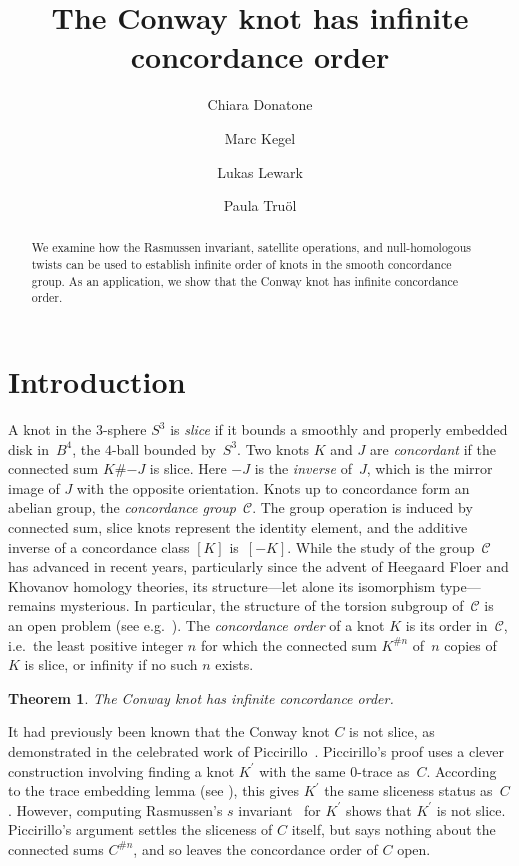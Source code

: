 \documentclass{amsart}
\title{The Conway knot has infinite concordance order}
\author{Chiara Donatone}
\author{Marc Kegel}
\author{Lukas Lewark}
\author{Paula Truöl}
\newcommand{\CC}{\mathcal{C}}
\newcommand{\pr}{^{\prime}}
\newtheorem{theorem}{Theorem}%
\theoremstyle{remark}
\begin{document}
\begin{abstract}
We examine how the Rasmussen invariant, satellite operations, and null-homologous twists can be used to establish infinite order of knots in the smooth concordance group. As an application, we show that the Conway knot has infinite concordance order.
\end{abstract}
\maketitle

\section{Introduction}

A knot in the $3$-sphere $S^3$ is \emph{slice} if it bounds a smoothly and properly embedded disk in~$B^4$, the $4$-ball bounded by~$S^3$. Two knots $K$ 
and $J$ are \emph{concordant} if the connected sum $K \# {-J}$ is slice. Here $-J$ is the \emph{inverse} of~$J$, which is the 
mirror image of $J$ with the opposite orientation.
Knots up to concordance form an abelian group, the \emph{concordance group}~$\CC$. The group operation is induced by connected sum, slice knots represent the identity element, and the additive inverse of a concordance class $[K]$ is~$[-K]$. While the study of the group~$\CC$ has advanced in recent years, particularly since the advent of Heegaard Floer and Khovanov homology theories, its structure---let alone its isomorphism type---remains mysterious. In particular, the structure of the torsion subgroup of~$\CC$ is an open problem (see e.g.~\cite[Problem~1.38]{K3_list}). The \emph{concordance order} of a knot $K$ is its order in~$\CC$, i.e.~the least positive integer $n$ for which the connected sum $K^{\#n}$ of~$n$ copies of~$K$ is slice, or infinity if no such $n$ exists.

\begin{theorem}\label{thm:Conway_inf_order}
The Conway knot has infinite concordance order.
\end{theorem}

It had previously been known that the Conway knot $C$ is not slice, as demonstrated in the celebrated work of Piccirillo~\cite{piccirillo:Conway}. Piccirillo's proof uses a clever construction involving finding a knot $K\pr$ with the same $0$-trace as~$C$. According to the trace embedding lemma (see ), this gives $K\pr$ the same sliceness status as~$C$. However, computing Rasmussen's $s$ invariant~\cite{rasmussen} for $K\pr$ shows that $K\pr$ is not slice. 
Piccirillo's argument settles the sliceness of $C$ itself, but says nothing about the connected sums $C^{\#n}$, and so leaves the concordance order of $C$ open.
\end{document}
